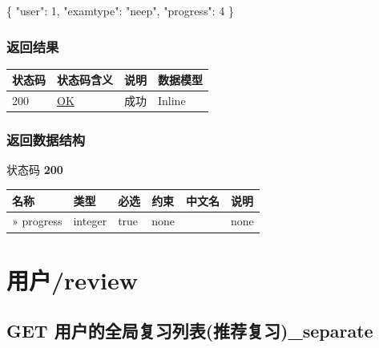 \documentclass[
]{article}
\newenvironment{Shaded}{}{}
\newcommand{\DataTypeTok}[1]{\textcolor[rgb]{0.56,0.13,0.00}{#1}}
\newcommand{\DecValTok}[1]{\textcolor[rgb]{0.25,0.63,0.44}{#1}}
\newcommand{\FunctionTok}[1]{\textcolor[rgb]{0.02,0.16,0.49}{#1}}
\newcommand{\StringTok}[1]{\textcolor[rgb]{0.25,0.44,0.63}{#1}}
\begin{document}
\begin{Shaded}
\begin{Highlighting}[]
\FunctionTok{\{}
  \DataTypeTok{"user"}\FunctionTok{:} \DecValTok{1}\FunctionTok{,}
  \DataTypeTok{"examtype"}\FunctionTok{:} \StringTok{"neep"}\FunctionTok{,}
  \DataTypeTok{"progress"}\FunctionTok{:} \DecValTok{4}
\FunctionTok{\}}
\end{Highlighting}
\end{Shaded}

\hypertarget{ux8fd4ux56deux7ed3ux679c-43}{%
\subsubsection{返回结果}\label{ux8fd4ux56deux7ed3ux679c-43}}

\begin{longtable}[]{@{}llll@{}}
\toprule
状态码 & 状态码含义 & 说明 & 数据模型 \\
\midrule
\endhead
200 & \href{https://tools.ietf.org/html/rfc7231\#section-6.3.1}{OK} &
成功 & Inline \\
\bottomrule
\end{longtable}

\hypertarget{ux8fd4ux56deux6570ux636eux7ed3ux6784-35}{%
\subsubsection{返回数据结构}\label{ux8fd4ux56deux6570ux636eux7ed3ux6784-35}}

状态码 \textbf{200}

\begin{longtable}[]{@{}llllll@{}}
\toprule
名称 & 类型 & 必选 & 约束 & 中文名 & 说明 \\
\midrule
\endhead
» progress & integer & true & none & & none \\
\bottomrule
\end{longtable}

\hypertarget{ux7528ux6237review}{%
\section{用户/review}\label{ux7528ux6237review}}

\hypertarget{get-ux7528ux6237ux7684ux5168ux5c40ux590dux4e60ux5217ux8868ux63a8ux8350ux590dux4e60separate}{%
\subsection{GET
用户的全局复习列表(推荐复习)\_separate}\label{get-ux7528ux6237ux7684ux5168ux5c40ux590dux4e60ux5217ux8868ux63a8ux8350ux590dux4e60separate}}
\end{document}
